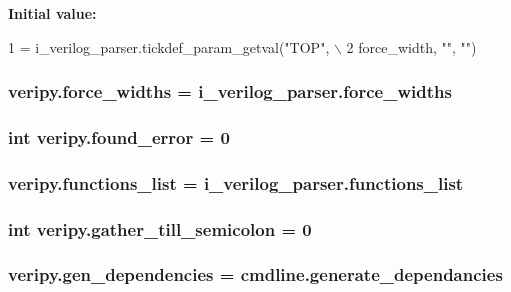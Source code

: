 {\bfseries Initial value\-:}
\begin{DoxyCode}
1 = i\_verilog\_parser.tickdef\_param\_getval(\textcolor{stringliteral}{"TOP"}, \(\backslash\)
2                     force\_width, \textcolor{stringliteral}{""}, \textcolor{stringliteral}{""})
\end{DoxyCode}
\hypertarget{namespaceveripy_a807b041df84d51d3d521d3bef8fd0caa}{
\subsubsection[{force\-\_\-widths}]{\setlength{\rightskip}{0pt plus 5cm}veripy.\-force\-\_\-widths = i\-\_\-verilog\-\_\-parser.\-force\-\_\-widths}}\label{namespaceveripy_a807b041df84d51d3d521d3bef8fd0caa}
\hypertarget{namespaceveripy_ad9424faeeafd0573d461ca2eb5305c91}{
\subsubsection[{found\-\_\-error}]{\setlength{\rightskip}{0pt plus 5cm}int veripy.\-found\-\_\-error = 0}}\label{namespaceveripy_ad9424faeeafd0573d461ca2eb5305c91}
\hypertarget{namespaceveripy_a2c9a3299c6e29cd2d14411235ab6e41c}{
\subsubsection[{functions\-\_\-list}]{\setlength{\rightskip}{0pt plus 5cm}veripy.\-functions\-\_\-list = i\-\_\-verilog\-\_\-parser.\-functions\-\_\-list}}\label{namespaceveripy_a2c9a3299c6e29cd2d14411235ab6e41c}
\hypertarget{namespaceveripy_a90f28d0208574d62b946c16a42d85318}{
\subsubsection[{gather\-\_\-till\-\_\-semicolon}]{\setlength{\rightskip}{0pt plus 5cm}int veripy.\-gather\-\_\-till\-\_\-semicolon = 0}}\label{namespaceveripy_a90f28d0208574d62b946c16a42d85318}
\hypertarget{namespaceveripy_a18bec95d0fbc7d055d8eccf5f9d04060}{
\subsubsection[{gen\-\_\-dependencies}]{\setlength{\rightskip}{0pt plus 5cm}veripy.\-gen\-\_\-dependencies = cmdline.\-generate\-\_\-dependancies}}\label{namespaceveripy_a18bec95d0fbc7d055d8eccf5f9d04060}
